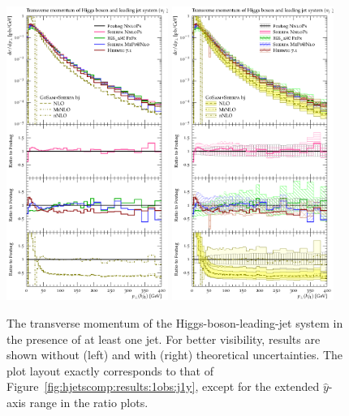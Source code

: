 \begin{figure}[t!]
  \centering
  \includegraphics[width=0.47\textwidth]{figures/hjetscomp_u_Hj_pT_incl.pdf}
  \hfill
  \includegraphics[width=0.47\textwidth]{figures/hjetscomp_Hj_pT_incl.pdf}
  \caption{\label{fig:hjetscomp:results:1obs:hj_pt}%
    The transverse momentum of the Higgs-boson-leading-jet system in
    the presence of at least one jet. For better visibility, results
    are shown without (left) and with (right) theoretical
    uncertainties. The plot layout exactly corresponds to that of
    Figure~\ref{fig:hjetscomp:results:1obs:j1y}, except for the
    extended $\hat y$-axis range in the ratio plots.}
\end{figure}

